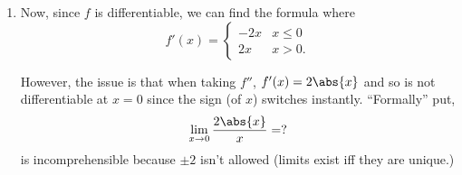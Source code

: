 \documentclass{article}
\begin{document}
\begin{enumerate}
\begin{enumerate}
          \item Now, since $f$ is differentiable, we can find the formula where
                \[ f'(x) = \begin{cases}
                  - 2x & x \le 0\\
                  2x & x > 0.
                \end{cases} \]

                However, the issue is that when taking $f''$, $f'(x) = 2\abs{x}$ and so is not differentiable at $x = 0$ since
                the sign (of $x$) switches instantly. ``Formally'' put,
                \[ \lim_{x \to 0}\frac{2\abs{x}}{x} = ? \]
                is incomprehensible because $\pm 2$ isn't allowed (limits exist iff they are unique.)

        \end{enumerate}

\end{enumerate}
\end{document}
